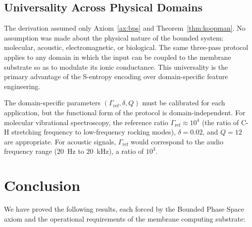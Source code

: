 \documentclass[11pt,twocolumn,a4paper]{article}
\theoremstyle{definition}
\theoremstyle{remark}
\begin{document}
\subsection{Universality Across Physical Domains}

The derivation assumed only Axiom~\ref{ax:bps} and Theorem~\ref{thm:koopman}.
No assumption was made about the physical nature of the bounded system: molecular,
acoustic, electromagnetic, or biological. The same three-pass protocol applies
to any domain in which the input can be coupled to the membrane substrate so as
to modulate its ionic conductance. This universality is the primary advantage of
the S-entropy encoding over domain-specific feature engineering.

The domain-specific parameters $(\Gamma_{\mathrm{ref}}, \delta, Q)$ must be
calibrated for each application, but the functional form of the protocol
is domain-independent. For molecular vibrational spectroscopy, the reference ratio
$\Gamma_{\mathrm{ref}} \approx 10^4$ (the ratio of C-H stretching frequency
to low-frequency rocking modes), $\delta = 0.02$, and $Q = 12$ are appropriate.
For acoustic signals, $\Gamma_{\mathrm{ref}}$ would correspond to the audio
frequency range ($20$~Hz to $20$~kHz), a ratio of $10^3$.

\section{Conclusion}
\label{sec:conclusion}

We have proved the following results, each forced by the Bounded Phase Space
axiom and the operational requirements of the membrane computing substrate:
\end{document}
